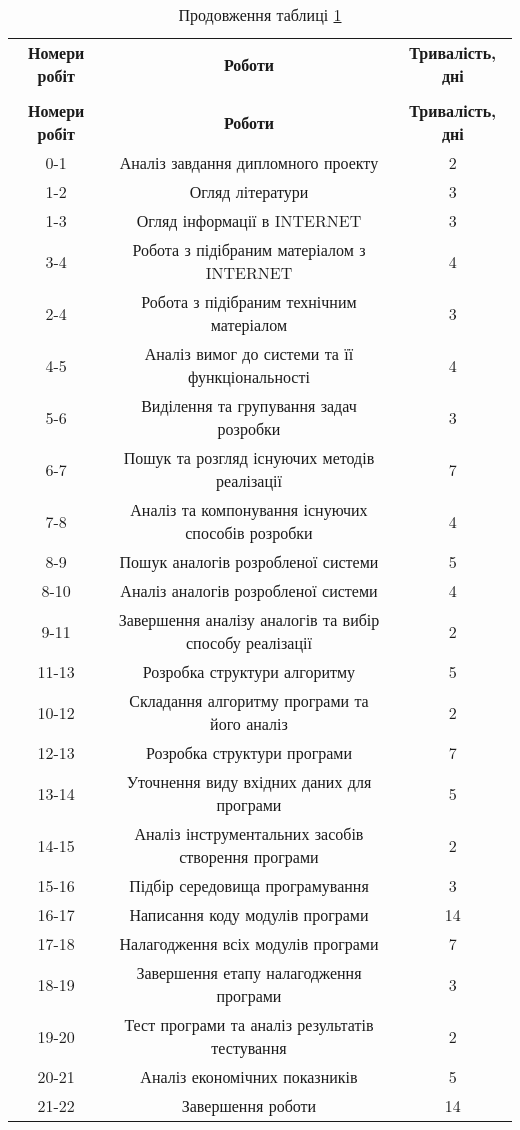 {\footnotesize
\begin{longtable}{|c|c|c|}
\captionsetup{justification=centering}
\caption{Роботи мережевого графа}\label{t:eco_2}\\
\hline
\multicolumn{1}{|c|}{\textbf{Номери робіт}}&
\multicolumn{1}{c|}{\textbf{Роботи}}&
\multicolumn{1}{c|}{\textbf{Тривалість, \newline дні}}\\\hline

\endfirsthead
\caption*{\hfill Продовження таблиці \ref{t:eco_2}}\\\hline

\multicolumn{1}{|c|}{\textbf{Номери робіт}}&
\multicolumn{1}{c|}{\textbf{Роботи}}&
\multicolumn{1}{c|}{\textbf{Тривалість, дні}}\\\hline
\endhead

0-1 & Аналіз завдання дипломного проекту & 2\\ \hline
1-2 & Огляд літератури & 3\\ \hline
1-3 & Огляд інформації в INTERNET & 3\\ \hline
3-4 & Робота з підібраним матеріалом з INTERNET & 4\\ \hline
2-4 & Робота з підібраним технічним матеріалом & 3\\ \hline
4-5 & Аналіз вимог до системи та її функціональності & 4\\ \hline
5-6 & Виділення та групування задач розробки & 3\\ \hline
6-7 & Пошук та розгляд існуючих методів реалізації & 7\\ \hline
7-8 & Аналіз та компонування існуючих способів розробки & 4\\ \hline
8-9 & Пошук аналогів розробленої системи & 5\\ \hline
8-10 & Аналіз аналогів розробленої системи & 4\\ \hline
9-11 & Завершення аналізу аналогів та вибір способу реалізації & 2\\ \hline
11-13 & Розробка структури алгоритму & 5\\ \hline
10-12 & Складання алгоритму програми та його аналіз & 2\\ \hline
12-13 & Розробка структури програми & 7\\ \hline
13-14 & Уточнення виду вхідних даних для програми & 5\\ \hline
14-15 & Аналіз інструментальних засобів створення програми & 2\\ \hline
15-16 & Підбір середовища програмування & 3\\ \hline
16-17 & Написання коду модулів програми & 14\\ \hline
17-18 & Налагодження всіх модулів програми & 7\\ \hline
18-19 & Завершення етапу налагодження програми & 3\\ \hline
19-20 & Тест програми та аналіз результатів тестування & 2\\ \hline
20-21 & Аналіз економічних показників & 5\\ \hline
21-22 & Завершення роботи & 14\\ \hline

\end{longtable}
}


